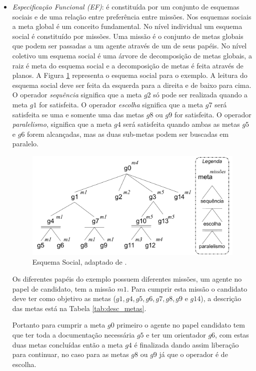 \begin{itemize}
\item {\it Especificação Funcional (EF)}: é constituída por um conjunto de esquemas sociais e de uma relação entre preferência entre missões. Nos esquemas sociais a meta global é um conceito fundamental. No nível individual um esquema social é constituído por missões. Uma missão é o conjunto de metas globais que podem ser passadas a um agente através de um de seus papéis. No nível coletivo um esquema social é uma árvore de decomposição de metas globais, a raiz é meta do esquema social e a decomposição de metas é feita através de planos. A Figura \ref{fig:es_exemplo} representa o esquema social para o exemplo. A leitura do esquema social deve ser feita da esquerda para a direita e de baixo para cima. O operador \textit{sequência} significa que a meta $g2$ só pode ser realizada quando a meta $g1$ for satisfeita. O operador \textit{escolha} significa que a meta $g7$ será satisfeita se uma e somente uma das metas $g8$ ou $g9$ for satisfeita. O operador \textit{paralelismo}, significa que a meta $g4$ será satisfeita quando ambas as metas $g5$ e $g6$ forem alcançadas, mas as duas sub-metas podem ser buscadas em paralelo. 
\begin{figure}[ht]
\centering
\includegraphics[scale=0.4]{imagens/ES2.pdf}
\caption{Esquema Social, adaptado de \cite{hubner2003modelo}.}
\label{fig:es_exemplo}
\end{figure}

Os diferentes papéis do exemplo possuem diferentes missões, um agente no papel de candidato, tem a missão $m1$. Para cumprir esta missão o candidato deve ter como objetivo as metas ($g1, g4, g5, g6, g7, g8, g9$ e $g14$), a descrição das metas está na Tabela \ref{tab:desc_metas}.

Portanto para cumprir a meta $g0$ primeiro o agente no papel candidato tem que ter toda a documentação necessária $g5$ e ter um orientador $g6$, com estas duas metas concluídas então a meta $g4$ é finalizada dando assim liberação para continuar, no caso para as metas $g8$ ou $g9$ já que o operador é de escolha.


\end{itemize}
